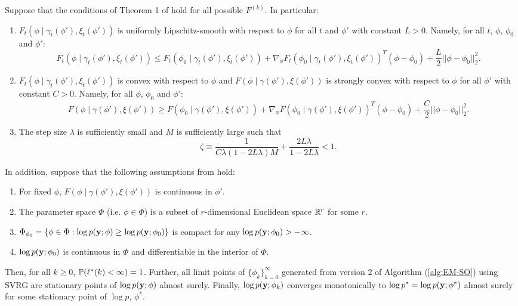     
\begin{theorem}

    Suppose that the conditions of Theorem 1 of \citet{Johnson:2013} hold for all possible $F^{(k)}$. In particular:
    
    \begin{enumerate}
        \item $F_t(\phi \mid \gamma_t(\phi'), \xi_t(\phi'))$ is uniformly Lipschitz-smooth with respect to $\phi$ for all $t$ and $\phi'$ with constant $L > 0$. Namely, for all $t$, $\phi$, $\phi_0$ and $\phi'$:
        $$F_t(\phi \mid \gamma_t(\phi'), \xi_t(\phi')) \leq F_t(\phi_0 \mid \gamma_t(\phi'), \xi_t(\phi')) + \nabla_\phi F_t(\phi_0 \mid \gamma_t(\phi'), \xi_t(\phi'))^T(\phi-\phi_0) + \frac{L}{2} ||\phi - \phi_0||_2^2.$$ 
        \item $F_t(\phi \mid \gamma_t(\phi'), \xi_t(\phi'))$ is convex with respect to $\phi$ and $F(\phi \mid \gamma(\phi'), \xi(\phi'))$ is strongly convex with respect to $\phi$ for all $\phi'$ with constant $C > 0$. Namely, for all $\phi$, $\phi_0$ and $\phi'$:
        $$F(\phi \mid \gamma(\phi'), \xi(\phi')) \geq F(\phi_0 \mid \gamma(\phi'), \xi(\phi')) + \nabla_\phi F(\phi_0 \mid \gamma(\phi'), \xi(\phi'))^T(\phi-\phi_0) + \frac{C}{2} ||\phi - \phi_0||_2^2.$$ 
        \item The step size $\lambda$ is sufficiently small and $M$ is sufficiently large such that 
        $$\zeta \equiv \frac{1}{C \lambda(1-2L\lambda)M} + \frac{2L\lambda}{1-2L\lambda} < 1.$$
    \end{enumerate}

    In addition, suppose that the following assumptions from \citet{Wu:1983} hold:

    \begin{enumerate}
        \item For fixed $\phi$, $F(\phi \mid \gamma(\phi'), \xi(\phi'))$ is continuous in $\phi'$.
        \item The parameter space $\Phi$ (i.e. $\phi \in \Phi$) is a subset of $r$-dimensional Euclidean space $\mathbb{R}^r$ for some $r$.
        \item $\Phi_{\phi_0} = \{\phi \in \Phi: \log p(\mathbf{y};\phi) \geq \log p(\mathbf{y};\phi_0)\}$ is compact for any $\log p(\mathbf{y};\phi_0) > -\infty$.
        \item $\log p(\mathbf{y};\phi_0)$ is continuous in $\Phi$ and differentiable in the interior of $\Phi$.
    \end{enumerate}
    
    Then, for all $k \geq 0$, $\mathbb{P}(\ell^*(k) < \infty) = 1$. Further, all limit points of $\{\phi_{k}\}_{k=0}^\infty$ generated from version 2 of Algorithm (\ref{alg:EM-SO}) using SVRG are stationary points of $\log p(\mathbf{y};\phi)$ almost surely. Finally, $\log p(\mathbf{y};\phi_{k})$ converges monotonically to $\log p^* = \log p(\mathbf{y};\phi^*)$ almost surely for some stationary point of $\log p$, $\phi^*$.
\end{theorem}
%

